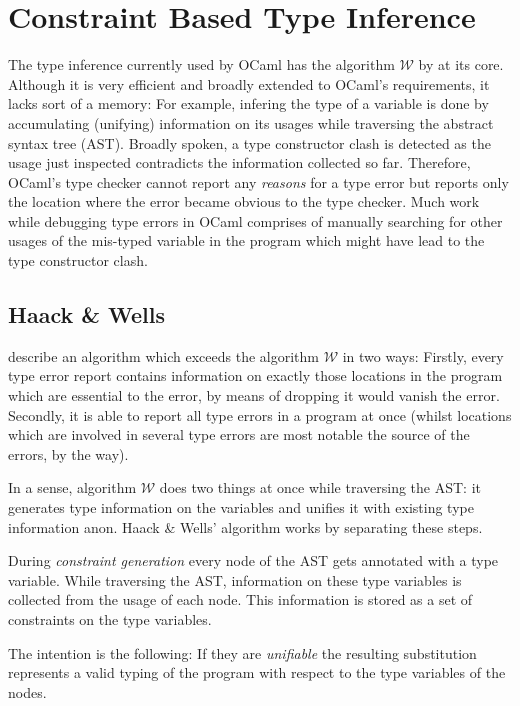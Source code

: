
\section{Constraint Based Type Inference}

The type inference currently used by OCaml has the algorithm $\mathcal W$ by
\citet{milner78} at its core.
Although it is very efficient and broadly extended to OCaml's 
requirements, it lacks sort of a memory:  For example, infering the type of a
variable is done by accumulating (unifying) information on its usages while
traversing the abstract syntax tree (AST).
Broadly spoken, a type constructor clash is detected as the usage just
inspected contradicts the information collected so far.
Therefore, OCaml's type checker cannot report any \emph{reasons} for a type
error but reports only the location where the error became obvious to the type
checker.
Much work while debugging type errors in OCaml comprises of manually searching
for other usages of the mis-typed variable in the program which might have lead
to the type constructor clash.


\subsection{Haack \& Wells}
\label{hd002001}
\citet{haackwells04} describe an algorithm which exceeds the algorithm
$\mathcal W$ in two ways:
Firstly, every type error report contains information on exactly those
locations in the program which are essential to the error, by means of dropping
it would vanish the error.
Secondly, it is able to report all type errors in a program at once (whilst
locations which are involved in several type errors are most notable the source
of the errors, by the way).

In a sense, algorithm $\mathcal W$ does two things at once while traversing the 
AST: it generates type information on the variables and unifies it with 
existing type information anon.  Haack \& Wells' algorithm works by separating
these steps.

During \emph{constraint generation} every node of the AST gets 
annotated with a type variable. While traversing the AST, information on 
these type variables is collected from the usage of each node.  This
information is stored as a set of constraints on the type variables.

The intention is the following: If they are \emph{unifiable} the resulting
substitution represents a valid typing of the program with respect to the type
variables of the nodes.


